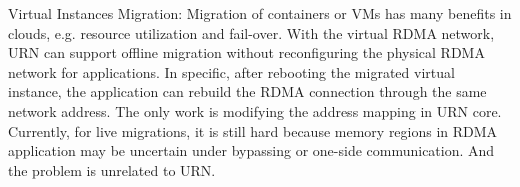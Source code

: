  Virtual Instances Migration: Migration of containers or VMs has many benefits in clouds, e.g. resource utilization and fail-over. With the virtual RDMA network, URN can support offline migration without reconfiguring the physical RDMA network for applications. In specific, after rebooting the migrated virtual instance, the application can rebuild the RDMA connection through the same network address. The only work is modifying the address mapping in URN core. Currently, for live migrations, it is still hard because memory regions in RDMA application may be uncertain under bypassing or one-side communication. And the problem is unrelated to URN.
